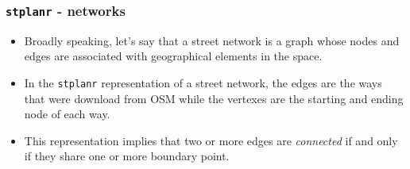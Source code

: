 \documentclass[c,10pt,pdftex]{beamer}
\begin{document}
\begin{frame}
  \frametitle{\texttt{stplanr} - networks}
  \vspace{-0.75cm}
  \begin{itemize}
    \setlength\itemsep{1em}
    \item Broadly speaking, let's say that a \alert{street network} is a graph whose nodes and edges are associated with geographical elements in the space. 
    \item In the \texttt{stplanr} representation of a street network, the edges are the ways that were download from OSM while the vertexes are the starting and ending node of each way. 
    \item This representation implies that two or more edges are \textit{connected} if and only if they share one or more boundary point. 
  \end{itemize}
\end{frame}
\end{document}
